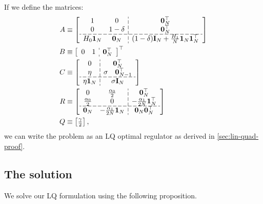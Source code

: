 \documentclass[12pt]{article}
\begin{document}
If we define the matrices:
\begin{align}
A &\equiv \left[\begin{array}{cc;{5pt/2 pt}c}
1 & 0 & \mathbf{0}_N^{\top}\\
0 & 1-\delta & \mathbf{0}_N^{\top}\\		
\hdashline[5pt/2 pt]
H_0 \mathbf{1}_N & \mathbf{0}_N & (1-\delta)\mathbf{I}_N + \frac{H_1}{N} \mathbf{1}_N \mathbf{1}_N^{\top}
\end{array}\right]\label{equ:LQ-A-matrix}\\
B&\equiv \left[\begin{array}{cc;{5pt/2 pt}c} 0 & 1 & \mathbf{0}_N^{\top} \end{array}\right]^{\top}\label{equ:LQ-B-matrix}\\
C &\equiv \left[\begin{array}{c;{5pt/2 pt}c}
0 & \mathbf{0}_N^{\top}\\
\eta & \begin{matrix}\sigma & \mathbf{0}_{N-1}^{\top}\end{matrix}\\
\hdashline[5pt/2 pt]
\eta \mathbf{1}_N & \sigma \mathbf{I}_N
\end{array}\right]\label{equ:LQ-C-matrix}\\
R &\equiv \left[\begin{array}{cc;{5pt/2 pt}c}
0 & \frac{\alpha_0}{2} & \mathbf{0}_N^{\top}\\
\frac{\alpha_0}{2} & 0 & -\frac{\alpha_1}{2 N}\mathbf{1}_N^{\top}\\
\hdashline[5pt/2 pt]
\mathbf{0}_N &  -\frac{\alpha_1}{2 N}\mathbf{1}_N & \mathbf{0}_N \mathbf{0}_N^{\top}
\end{array}\right]\label{equ:LQ-R-matrix}\\
Q &\equiv \begin{bmatrix}
\frac{\gamma}{2}
\end{bmatrix},\label{equ:LQ-Q-matrix}
\end{align}
we can write the problem as an LQ optimal regulator as derived in \cref{sec:lin-quad-proof}.

\subsection{The solution}

We solve our LQ formulation using the following proposition.
	
\end{document}
